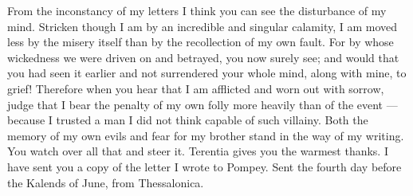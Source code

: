  From the inconstancy of my letters I think you can see the disturbance of my mind. Stricken though I am by an incredible and singular calamity, I am moved less by the misery itself than by the recollection of my own fault. For by whose wickedness we were driven on and betrayed, you now surely see; and would that you had seen it earlier and not surrendered your whole mind, along with mine, to grief! Therefore when you hear that I am afflicted and worn out with sorrow, judge that I bear the penalty of my own folly more heavily than of the event --- because I trusted a man I did not think capable of such villainy. Both the memory of my own evils and fear for my brother stand in the way of my writing. You watch over all that and steer it. Terentia gives you the warmest thanks. I have sent you a copy of the letter I wrote to Pompey. Sent the fourth day before the Kalends of June, from Thessalonica.
